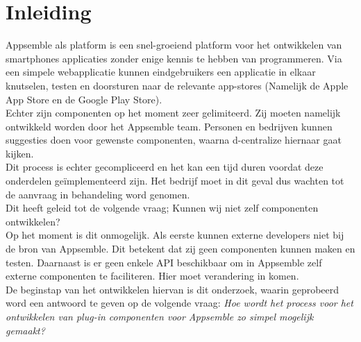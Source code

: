 \chapter{Inleiding}

Appsemble als platform is een snel-groeiend platform voor het ontwikkelen van smartphones applicaties zonder enige kennis te hebben van programmeren. Via een simpele webapplicatie kunnen eindgebruikers een applicatie in elkaar knutselen, testen en doorsturen naar de relevante app-stores (Namelijk de Apple App Store en de Google Play Store). \\

Echter zijn componenten op het moment zeer gelimiteerd. Zij moeten namelijk ontwikkeld worden door het Appsemble team. Personen en bedrijven kunnen suggesties doen voor gewenste componenten, waarna d-centralize hiernaar gaat kijken. \\

Dit process is echter gecompliceerd en het kan een tijd duren voordat deze onderdelen ge\"{i}mplementeerd zijn. Het bedrijf moet in dit geval dus wachten tot de aanvraag in behandeling word genomen. \\

Dit heeft geleid tot de volgende vraag; Kunnen wij niet zelf componenten ontwikkelen? \\

Op het moment is dit onmogelijk. Als eerste kunnen externe developers niet bij de bron van Appsemble. Dit betekent dat zij geen componenten kunnen maken en testen. Daarnaast is er geen enkele API beschikbaar om in Appsemble zelf externe componenten te faciliteren. Hier moet verandering in komen.\\

De beginstap van het ontwikkelen hiervan is dit onderzoek, waarin geprobeerd word een antwoord te geven op de volgende vraag: \emph{Hoe wordt het process voor het ontwikkelen van plug-in componenten voor Appsemble zo simpel mogelijk gemaakt?}
